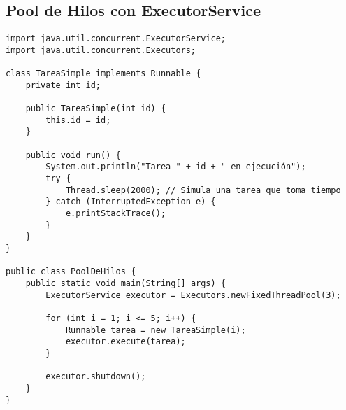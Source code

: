 \documentclass{article}
\begin{document}
\subsection{Pool de Hilos con ExecutorService}
\begin{verbatim}
import java.util.concurrent.ExecutorService;
import java.util.concurrent.Executors;

class TareaSimple implements Runnable {
    private int id;

    public TareaSimple(int id) {
        this.id = id;
    }

    public void run() {
        System.out.println("Tarea " + id + " en ejecución");
        try {
            Thread.sleep(2000); // Simula una tarea que toma tiempo
        } catch (InterruptedException e) {
            e.printStackTrace();
        }
    }
}

public class PoolDeHilos {
    public static void main(String[] args) {
        ExecutorService executor = Executors.newFixedThreadPool(3);

        for (int i = 1; i <= 5; i++) {
            Runnable tarea = new TareaSimple(i);
            executor.execute(tarea);
        }

        executor.shutdown();
    }
}
\end{verbatim}
\end{document}
